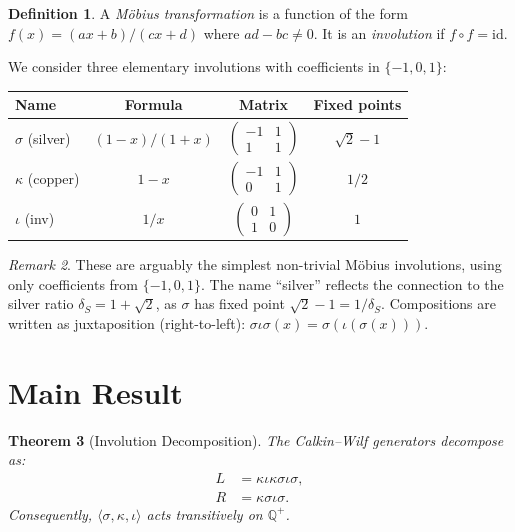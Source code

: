 \documentclass[11pt]{article}
\theoremstyle{plain}
\newtheorem{theorem}{Theorem}
\theoremstyle{definition}
\newtheorem{definition}[theorem]{Definition}
\theoremstyle{remark}
\newtheorem{remark}[theorem]{Remark}
\begin{document}
\begin{definition}
A \emph{M\"obius transformation} is a function of the form $f(x) = (ax+b)/(cx+d)$
where $ad - bc \neq 0$. It is an \emph{involution} if $f \circ f = \mathrm{id}$.
\end{definition}

We consider three elementary involutions with coefficients in $\{-1, 0, 1\}$:

\begin{center}
\begin{tabular}{lccc}
\toprule
Name & Formula & Matrix & Fixed points \\
\midrule
$\sigma$ (silver) & $(1-x)/(1+x)$ & $\begin{pmatrix} -1 & 1 \\ 1 & 1 \end{pmatrix}$ & $\sqrt{2}-1$ \\[2mm]
$\kappa$ (copper) & $1-x$ & $\begin{pmatrix} -1 & 1 \\ 0 & 1 \end{pmatrix}$ & $1/2$ \\[2mm]
$\iota$ (inv) & $1/x$ & $\begin{pmatrix} 0 & 1 \\ 1 & 0 \end{pmatrix}$ & $1$ \\
\bottomrule
\end{tabular}
\end{center}

\begin{remark}
These are arguably the simplest non-trivial M\"obius involutions, using only
coefficients from $\{-1, 0, 1\}$. The name ``silver'' reflects the connection
to the silver ratio $\delta_S = 1 + \sqrt{2}$, as $\sigma$ has fixed point
$\sqrt{2} - 1 = 1/\delta_S$.
Compositions are written as juxtaposition (right-to-left): $\sigma\iota\sigma(x) = \sigma(\iota(\sigma(x)))$.
\end{remark}

\section{Main Result}

\begin{theorem}[Involution Decomposition]\label{thm:main}
The Calkin--Wilf generators decompose as:
\begin{align}
L &= \kappa\iota\kappa\sigma\iota\sigma, \\
R &= \kappa\sigma\iota\sigma.
\end{align}
Consequently, $\langle \sigma, \kappa, \iota \rangle$ acts transitively on $\mathbb{Q}^+$.
\end{theorem}
\end{document}
